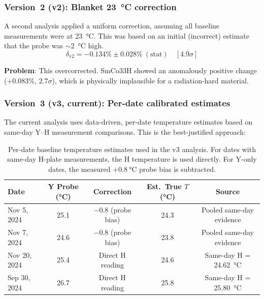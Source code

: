 \documentclass[11pt,letterpaper]{article}
\begin{document}
\subsubsection{Version~2 (v2): Blanket \SI{23}{\celsius} correction}

A second analysis applied a uniform correction, assuming all baseline
measurements were at \SI{23}{\celsius}. This was based on an initial (incorrect)
estimate that the probe was $\sim$\SI{2}{\celsius} high.
\begin{equation*}
    \delta_\mathrm{v2} = -0.134\% \pm 0.028\%~(\mathrm{stat}) \quad [4.9\sigma]
\end{equation*}

\textbf{Problem}: This overcorrected. SmCo33H showed an anomalously positive
change ($+0.083\%$, $2.7\sigma$), which is physically implausible for a
radiation-hard material.

\subsubsection{Version~3 (v3, current): Per-date calibrated estimates}

The current analysis uses data-driven, per-date temperature estimates based on
same-day Y--H measurement comparisons. This is the best-justified approach:

\begin{table}[H]
\centering
\caption{Per-date baseline temperature estimates used in the v3 analysis. For
dates with same-day H-plate measurements, the H temperature is used directly.
For Y-only dates, the measured $+\SI{0.8}{\celsius}$ probe bias is subtracted.}
\label{tab:temp_v3}
\begin{tabular}{@{}lcccc@{}}
\toprule
\textbf{Date} & \textbf{Y Probe (\si{\celsius})} &
\textbf{Correction} & \textbf{Est.\ True $T$ (\si{\celsius})} &
\textbf{Source} \\
\midrule
Nov 5, 2024  & 25.1 & $-0.8$ (probe bias) & 24.3 & Pooled same-day evidence \\
Nov 7, 2024  & 24.6 & $-0.8$ (probe bias) & 23.8 & Pooled same-day evidence \\
Nov 20, 2024 & 25.4 & Direct H reading    & 24.6 & Same-day H = \SI{24.62}{\celsius} \\
Sep 30, 2024 & 26.7 & Direct H reading    & 25.8 & Same-day H = \SI{25.80}{\celsius} \\
\bottomrule
\end{tabular}
\end{table}
\end{document}
